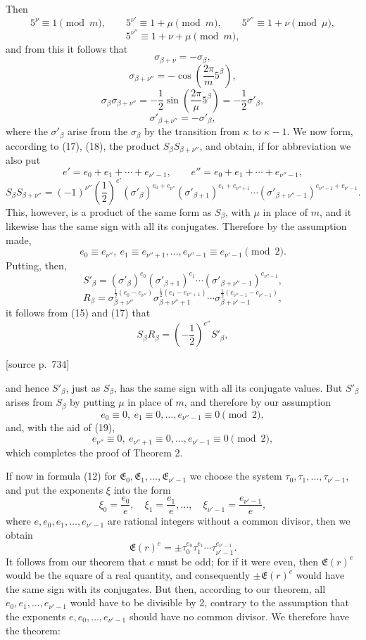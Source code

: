 \documentclass[11pt]{article}
\newcommand{\srcpage}[1]{\par\medskip\noindent\textsf{[source p.~#1]}\par\smallskip}
\begin{document}
Then
\[
5^\nu\equiv1\pmod m,
\qquad 5^{\nu'}\equiv1+\mu\pmod m,
\qquad 5^{\nu''}\equiv1+\nu\pmod\mu,
\]
\[
5^{\nu''}\equiv1+\nu+\mu\pmod m,
\]
and from this it follows that
\[
\sigma_{\beta+\nu}=-\sigma_\beta,
\]
\[
\sigma_{\beta+\nu''}=-\cos\left(\frac{2\pi}{m}5^\beta\right),
\]
\begin{equation}
\sigma_\beta\sigma_{\beta+\nu''}=-\frac12\sin\left(\frac{2\pi}{\mu}5^\beta\right)=-\frac12\sigma'_\beta,
\tag{17}
\end{equation}
\begin{equation}
\sigma'_{\beta+\nu''}=-\sigma'_\beta,
\tag{18}
\end{equation}
where the $\sigma'_\beta$ arise from the $\sigma_\beta$ by the transition from $\kappa$ to $\kappa-1$. We now form, according to (17), (18), the product $S_\beta S_{\beta+\nu''}$, and obtain, if for abbreviation we also put
\[
e'=e_0+e_1+\cdots+e_{\nu'-1},
\qquad e''=e_0+e_1+\cdots+e_{\nu''-1},
\]
\[
S_\beta S_{\beta+\nu''}=(-1)^{\nu''}\left(\frac12\right)^{e'}
(\sigma'_\beta)^{e_0+e_{\nu''}}(\sigma'_{\beta+1})^{e_1+e_{\nu''+1}}\cdots
(\sigma'_{\beta+\nu''-1})^{e_{\nu''-1}+e_{\nu'-1}}.
\]
This, however, is a product of the same form as $S_\beta$, with $\mu$ in place of $m$, and it likewise has the same sign with all its conjugates. Therefore by the assumption made,
\begin{equation}
e_0\equiv e_{\nu''},\ e_1\equiv e_{\nu''+1},\ldots,e_{\nu''-1}\equiv e_{\nu'-1}\pmod2.
\tag{19}
\end{equation}
Putting, then,
\[
S'_\beta=(\sigma'_\beta)^{e_0}(\sigma'_{\beta+1})^{e_1}\cdots(\sigma'_{\beta+\nu''-1})^{e_{\nu''-1}},
\]
\[
R_\beta=\sigma_{\beta+\nu''}^{\frac12(e_0-e_{\nu''})}
\sigma_{\beta+\nu''+1}^{\frac12(e_1-e_{\nu''+1})}\cdots
\sigma_{\beta+\nu'-1}^{\frac12(e_{\nu''-1}-e_{\nu'-1})},
\]
it follows from (15) and (17) that
\[
S_\beta R_\beta=\left(-\frac12\right)^{e''}S'_\beta,
\]
\srcpage{734}
and hence $S'_\beta$, just as $S_\beta$, has the same sign with all its conjugate values. But $S'_\beta$ arises from $S_\beta$ by putting $\mu$ in place of $m$, and therefore by our assumption
\[
e_0\equiv0,\ e_1\equiv0,\ldots,e_{\nu''-1}\equiv0\pmod2,
\]
and, with the aid of (19),
\[
e_{\nu''}\equiv0,\ e_{\nu''+1}\equiv0,\ldots,e_{\nu'-1}\equiv0\pmod2,
\]
which completes the proof of Theorem 2.

If now in formula (12) for $\mathfrak E_0,\mathfrak E_1,\ldots,\mathfrak E_{\nu'-1}$ we choose the system $\tau_0,\tau_1,\ldots,\tau_{\nu'-1}$, and put the exponents $\xi$ into the form
\[
\xi_0=\frac{e_0}{e},\quad \xi_1=\frac{e_1}{e},\ldots,\quad \xi_{\nu'-1}=\frac{e_{\nu'-1}}{e},
\]
where $e,e_0,e_1,\ldots,e_{\nu'-1}$ are rational integers without a common divisor, then we obtain
\[
\mathfrak E(r)^e=\pm\tau_0^{e_0}\tau_1^{e_1}\cdots\tau_{\nu'-1}^{e_{\nu'-1}}.
\]
It follows from our theorem that $e$ must be odd; for if it were even, then $\mathfrak E(r)^e$ would be the square of a real quantity, and consequently $\pm\mathfrak E(r)^e$ would have the same sign with its conjugates. But then, according to our theorem, all $e_0,e_1,\ldots,e_{\nu'-1}$ would have to be divisible by 2, contrary to the assumption that the exponents $e,e_0,
\ldots,e_{\nu'-1}$ should have no common divisor. We therefore have the theorem:
\end{document}
